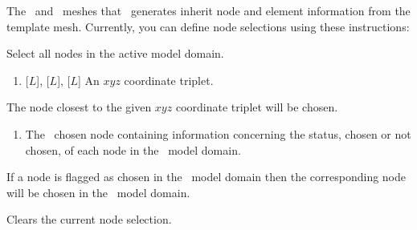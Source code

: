 The \swf\ and \gwf\ meshes that \mut\ generates inherit node and element information from the template mesh.  Currently, you can define node selections using these instructions: \label{page:nodeSelect}

    {Select all nodes in the active model domain.
     }

    {
        \squish
        \begin{enumerate}
        \item {} [$L$],  [$L$],  [$L$]  An $xyz$ coordinate triplet.
        \end{enumerate}
        The node closest to the given $xyz$ coordinate triplet will be chosen.
    }

    {
        \squish
        \begin{enumerate}
        \item {}  The \gb\ chosen node  containing information concerning the status, chosen or not chosen, of each node in the \gb\ model domain.
        \end{enumerate}
          If a node is flagged as chosen in the \gb\ model domain then the corresponding node will be chosen in the \mfus\ model domain.
    }

    {Clears the current node selection.
     }



